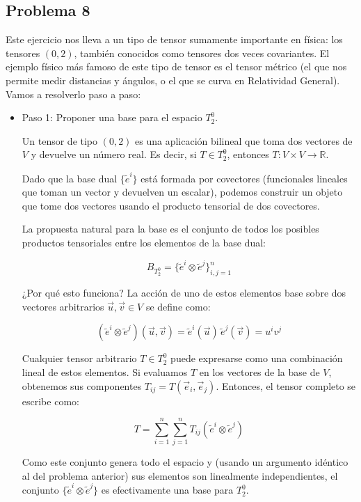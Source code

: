 \documentclass[11pt,spanish]{article}
\newcounter{problema}
\begin{document}
\subsection*{Problema 8}

Este ejercicio nos lleva a un tipo de tensor sumamente importante en física: los tensores $(0,2)$, también conocidos como tensores dos veces covariantes. El ejemplo físico más famoso de este tipo de tensor es el tensor métrico (el que nos permite medir distancias y ángulos, o el que se curva en Relatividad General).
Vamos a resolverlo paso a paso:

\begin{itemize}
\item Paso 1: Proponer una base para el espacio $T_2^0$.

Un tensor de tipo $(0,2)$ es una aplicación bilineal que toma dos vectores de $V$ y devuelve un número real. Es decir, si $T \in T_2^0$, entonces $T: V \times V \to \mathbb{R}$.

Dado que la base dual $\{\tilde{e}^i\}$ está formada por covectores (funcionales lineales que toman un vector y devuelven un escalar), podemos construir un objeto que tome dos vectores usando el producto tensorial de dos covectores.

La propuesta natural para la base es el conjunto de todos los posibles productos tensoriales entre los elementos de la base dual:


$$B_{T_2^0} = \{ \tilde{e}^i \otimes \tilde{e}^j \}_{i,j=1}^n$$

¿Por qué esto funciona? La acción de uno de estos elementos base sobre dos vectores arbitrarios $\vec{u}, \vec{v} \in V$ se define como:

$$
(\tilde{e}^i \otimes \tilde{e}^j)(\vec{u}, \vec{v}) 
=
\tilde{e}^i(\vec{u}) \, \tilde{e}^j(\vec{v})
=
u^i v^j$$

Cualquier tensor arbitrario $T \in T_2^0$ puede expresarse como una combinación lineal de estos elementos. Si evaluamos $T$ en los vectores de la base de $V$, obtenemos sus componentes $T_{ij} = T(\vec{e}_i, \vec{e}_j)$. Entonces, el tensor completo se escribe como:


$$T = \sum_{i=1}^n \sum_{j=1}^n T_{ij} (\tilde{e}^i \otimes \tilde{e}^j)$$

Como este conjunto genera todo el espacio y (usando un argumento idéntico al del problema anterior) sus elementos son linealmente independientes, el conjunto $\{ \tilde{e}^i \otimes \tilde{e}^j \}$ es efectivamente una base para $T_2^0$.


\end{itemize}
\end{document}
